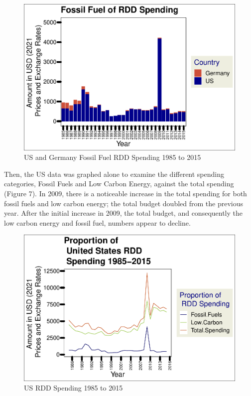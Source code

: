 \documentclass[
  12pt,
]{article}
\begin{document}
\begin{figure}
\centering
\includegraphics{Chang_Jenkins_Mullens_ENV872_Final_files/figure-latex/US and Germ fossil fuel Bar-1.pdf}
\caption{US and Germany Fossil Fuel RDD Spending 1985 to 2015}
\end{figure}

\newpage

Then, the US data was graphed alone to examine the different spending
categories, Fossil Fuels and Low Carbon Energy, against the total
spending (Figure 7). In 2009, there is a noticeable increase in the
total spending for both fossil fuels and low carbon energy; the total
budget doubled from the previous year. After the initial increase in
2009, the total budget, and consequently the low carbon energy and
fossil fuel, numbers appear to decline.

\begin{figure}
\centering
\includegraphics{Chang_Jenkins_Mullens_ENV872_Final_files/figure-latex/Line Plot of All US RDD-1.pdf}
\caption{US RDD Spending 1985 to 2015}
\end{figure}
\end{document}
